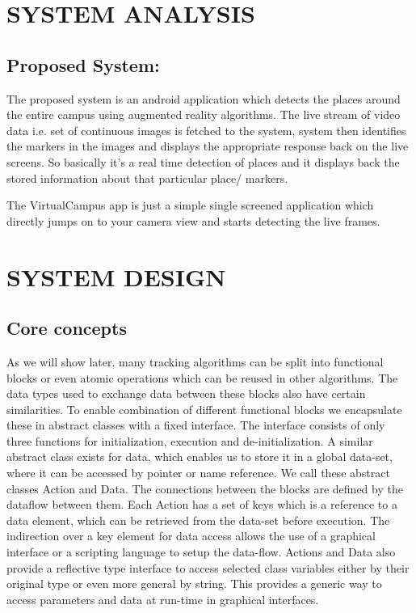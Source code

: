 \documentclass{article}
\begin{document}

\newpage
\section{SYSTEM ANALYSIS }
\subsection{Proposed System: }
\par The proposed system is an android application which detects the places around the entire campus using augmented reality algorithms. The live stream of video data i.e. set of continuous images is fetched to the system, system then identifies the markers in the images and displays the appropriate response back on the live screens. So basically it’s a real time detection of places and it displays back the stored information about that particular place/ markers. 
\par The VirtualCampus app is just a simple single screened application which directly jumps on to your camera view and starts detecting the live frames.   




\newpage
\section{SYSTEM DESIGN }
\subsection{Core concepts }
\par As we will show later, many tracking algorithms can be split into functional blocks or even atomic operations which can be reused in other algorithms. The data types used to exchange data between these blocks also have certain similarities. To enable combination of different functional blocks we encapsulate these in abstract classes with a ﬁxed interface. The interface consists of only three functions for initialization, execution and de-initialization. A similar abstract class exists for data, which enables us to store it in a global data-set, where it can be accessed by pointer or name reference. We call these abstract classes Action and Data. The connections between the blocks are deﬁned by the dataﬂow between them. Each Action has a set of keys which is a reference to a data element, which can be retrieved from the data-set before execution. The indirection over a key element for data access allows the use of a graphical interface or a scripting language to setup the data-ﬂow. Actions and Data also provide a reﬂective type interface to access selected class variables either by their original type or even more general by string. This provides a generic way to access parameters and data at run-time in graphical interfaces.  
\end{document}
